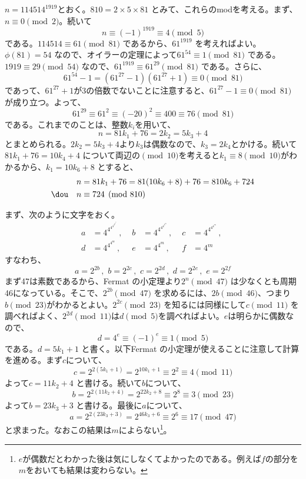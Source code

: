 $n=114514^{1919}$とおく。$810=2\times 5\times 81$ とみて、これらのmodを考える。まず、$n\equiv 0\pmod{2}$。続いて
\[ n\equiv (-1)^{1919}\equiv 4 \pmod{5} \]
である。$114514\equiv 61 \pmod{81}$ であるから、$61^{1919}$ を考えればよい。$\phi(81)=54$ なので、オイラーの定理によって$61^{54}\equiv 1\pmod{81}$ である。$1919\equiv 29 \pmod{54}$ なので、$61^{1919}\equiv 61^{29} \pmod{81}$ である。さらに、
\[ 61^{54}-1=(61^{27}-1)(61^{27}+1) \equiv 0 \pmod{81} \]
であって、$61^{27}+1$が3の倍数でないことに注意すると、$61^{27}-1\equiv 0\pmod{81}$ が成り立つ。よって、
\[ 61^{29} \equiv 61^2\equiv (-20)^2\equiv 400 \equiv 76 \pmod{81} \]
である。これまでのことは、整数$k_i$を用いて、
\[ n=81k_1+76=2k_2=5k_3+4 \]
とまとめられる。$2k_2=5k_3+4$より$k_3$は偶数なので、$k_3=2k_4$とかける。続いて$81k_1+76=10k_4+4$ について両辺の$\pmod{10}$を考えると$k_1\equiv 8 \pmod{10}$がわかるから、$k_1=10k_6+8$ とすると、
\begin{align*}
 n&=81k_1+76=81(10k_6+8)+76=810k_6+724 \\
 \dou\quad n&\equiv 724 \pmod{810}
\end{align*}

まず、次のように文字をおく。
\begin{align*}
 a&=4^{4^{4^{4^{4^{4^m}}}}} \,,\,\,& b&=4^{4^{4^{4^{4^m}}}} \,,\,\,& c&=4^{4^{4^{4^m}}} \,,\,\,  \\
 d&=4^{4^{4^m}} \,,\,\,& e&=4^{4^m} \,,\,\,& f&=4^m
\end{align*}
すなわち、
\[ a=2^{2b} \,,\,\, b=2^{2c} \,,\,\, c=2^{2d} \,,\,\, d=2^{2e} \,,\,\, e=2^{2f} \]
まず47は素数であるから、Fermat の小定理より$2^n \pmod{47}$ は少なくとも周期46になっている。そこで、$2^{2b} \pmod{47}$ を求めるには、$2b\pmod{46}$、つまり$b\pmod{23}$がわかるとよい。$2^{2c}\pmod{23}$ を知るには同様にして$c\pmod{11}$ を調べればよく、$2^{2d}\pmod{11}$は$d\pmod{5}$を調べればよい。$e$は明らかに偶数なので、
\[ d=4^e\equiv (-1)^e\equiv 1\pmod{5} \]
である。$d=5k_1+1$ と書く。以下Fermat の小定理が使えることに注意して計算を進める。まず$c$について、
\[ c=2^{2(5k_1+1)}=2^{10k_1+1}\equiv 2^2\equiv 4 \pmod{11} \]
よって$c=11k_2+4$ と書ける。続いて$b$について、
\[ b=2^{2(11k_2+4)}=2^{22k_2+8}\equiv 2^8\equiv 3 \pmod{23} \]
よって$b=23k_3+3$ と書ける。最後に$a$について、
\[ a=2^{2(23k_3+3)}=2^{46k_3+6}\equiv 2^6\equiv 17 \pmod{47} \]
と求まった。なおこの結果は$m$によらない\footnote{$e$が偶数だとわかった後は気にしなくてよかったのである。例えば$f$の部分を$m$をおいても結果は変わらない。}。